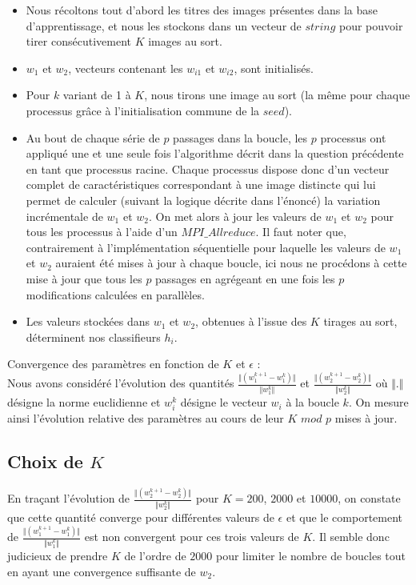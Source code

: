 \documentclass[a4paper,11pt]{article}
\begin{document}
\begin{itemize}
	\item Nous récoltons tout d’abord les titres des images présentes dans la base d’apprentissage, et nous les stockons dans un vecteur de $string$ pour pouvoir tirer consécutivement $K$ images au sort. \\
	\item  $w_1$ et $w_2$, vecteurs contenant les $w_{i1}$ et $w_{i2}$, sont initialisés.\\
	\item  Pour $k$ variant de 1 à $K$, nous tirons une image au sort (la même pour chaque processus grâce à l’initialisation commune de la $seed$).\\
	\item  Au bout de chaque série de $p$ passages dans la boucle, les $p$ processus ont appliqué une et une seule fois l’algorithme décrit dans la question précédente en tant que processus racine. Chaque processus dispose donc d’un vecteur complet de caractéristiques correspondant à une image distincte qui lui permet de calculer (suivant la logique décrite dans l’énoncé) la variation incrémentale de $w_1$ et $w_2$. On met alors à jour les valeurs de $w_1$ et $w_2$ pour tous les processus à l’aide d’un $MPI\_Allreduce$. Il faut noter que, contrairement à l'implémentation séquentielle pour laquelle les valeurs de $w_1$ et $w_2$ auraient été mises à jour à chaque boucle, ici nous ne procédons à cette mise à jour que tous les $p$ passages en agrégeant en une fois les $p$ modifications calculées en parallèles. \\
	\item  Les valeurs stockées dans $w_1$ et $w_2$, obtenues à l’issue des $K$ tirages au sort, déterminent nos classifieurs $h_i$.\\
		
\end{itemize}

Convergence des paramètres en fonction de $K$ et $\epsilon$ :\\
Nous avons considéré l'évolution des quantités $  \frac{\Vert(w_1^{k+1} - w_1^{k})\Vert}{\Vert w_1^{k}\Vert}$ et $  \frac{\Vert(w_2^{k+1} - w_2^{k})\Vert}{\Vert w_2^{k}\Vert}$ où $\Vert . \Vert$ désigne la norme euclidienne et $w_i^k$ désigne le vecteur $w_i$ à la boucle $k$. On mesure ainsi l'évolution relative des paramètres au cours de leur $K$ $mod$ $p$ mises à jour. 

\subsection{Choix de $K$}
En traçant l'évolution de $  \frac{\Vert(w_2^{k+1} - w_2^{k})\Vert}{\Vert w_2^{k}\Vert}$ pour $K = 200$, $2000$ et $10000$, on constate que cette quantité converge pour différentes valeurs de $\epsilon$ et que le comportement de $  \frac{\Vert(w_1^{k+1} - w_1^{k})\Vert}{\Vert w_1^{k}\Vert}$ est non convergent pour ces trois valeurs de $K$. Il semble donc judicieux de prendre $K$ de l'ordre de $2000$ pour limiter le nombre de boucles tout en ayant une convergence suffisante de $w_2$. \\
\end{document}
